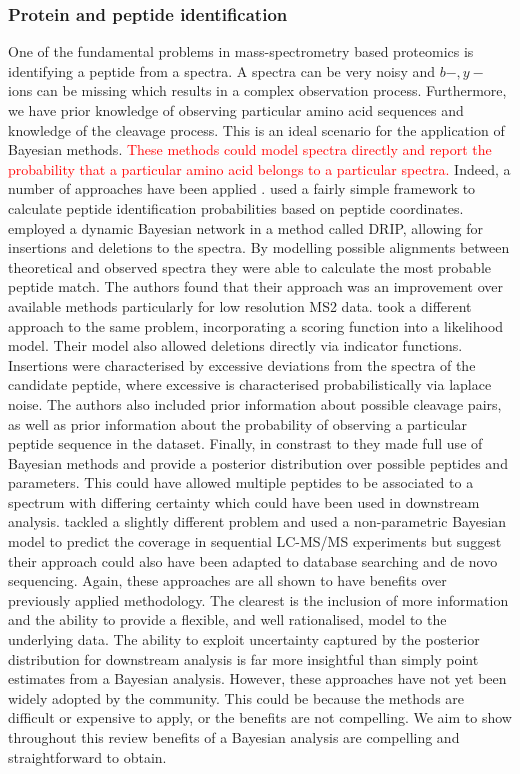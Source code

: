 \documentclass[12pt,english, journal=jpr, layout=twocolumn]{article}
\begin{document}
\subsubsection{Protein and peptide identification}
One of the fundamental problems in mass-spectrometry based proteomics is identifying a peptide from a spectra. A spectra can be very noisy and $b-,y-$ ions can be missing which results in a complex observation process. Furthermore, we have prior knowledge of observing particular amino acid sequences and knowledge of the cleavage process. This is an ideal scenario for the application of Bayesian methods. \textcolor{red}{ These methods could model spectra directly and report the probability that a particular amino acid belongs to a particular spectra.} Indeed, a number of approaches have been applied \citep{Chen::2005, Halloran::2016, Lewis::2018, Claassen::2009}. \citet{Chen::2005} used a fairly simple framework to calculate peptide identification probabilities based on peptide coordinates. \citet{Halloran::2016} employed a dynamic Bayesian network in a method called DRIP, allowing for insertions and deletions to the spectra. By modelling possible alignments between theoretical and observed spectra they were able to calculate the most probable peptide match. The authors found that their approach was an improvement over available methods particularly for low resolution MS2 data. \citet{Lewis::2018} took a different approach to the same problem, incorporating a scoring function into a likelihood model. Their model also allowed deletions directly via indicator functions. Insertions were characterised by excessive deviations from the spectra of the candidate peptide, where excessive is characterised probabilistically via laplace noise. The authors also included prior information about possible cleavage pairs, as well as prior information about the probability of observing a particular peptide sequence in the dataset. Finally, in constrast to \citet{Halloran::2016} they made full use of Bayesian methods and provide a posterior distribution over possible peptides and parameters. This could have allowed multiple peptides to be associated to a spectrum with differing certainty which could have been used in downstream analysis. \citet{Claassen::2009} tackled a slightly different problem and used a non-parametric Bayesian model to predict the coverage in sequential LC-MS/MS experiments but suggest their approach could also have been adapted to database searching and de novo sequencing. Again, these approaches are all shown to have benefits over previously applied methodology. The clearest is the inclusion of more information and the ability to provide a flexible, and well rationalised, model to the underlying data. The ability to exploit uncertainty captured by the posterior distribution for downstream analysis is far more insightful than simply point estimates from a Bayesian analysis. However, these approaches have not yet been widely adopted by the community. This could be because the methods are difficult or expensive to apply, or the benefits are not compelling. We aim to show throughout this review benefits of a Bayesian analysis are compelling and straightforward to obtain.
\end{document}
